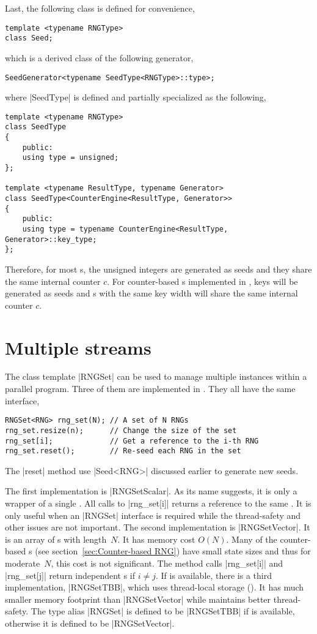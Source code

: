 Last, the following class is defined for convenience,
\begin{verbatim}
template <typename RNGType>
class Seed;
\end{verbatim}
which is a derived class of the following generator,
\begin{verbatim}
SeedGenerator<typename SeedType<RNGType>::type>;
\end{verbatim}
where |SeedType| is defined and partially specialized as the following,
\begin{verbatim}
template <typename RNGType>
class SeedType
{
    public:
    using type = unsigned;
};

template <typename ResultType, typename Generator>
class SeedType<CounterEngine<ResultType, Generator>>
{
    public:
    using type = typename CounterEngine<ResultType, Generator>::key_type;
};
\end{verbatim}
Therefore, for most \rng{}s, the unsigned integers are generated as seeds and
they share the same internal counter $c$. For counter-based \rng{}s implemented
in \mckl, keys will be generated as seeds and \rng{}s with the same key width
will share the same internal counter $c$.

\section{Multiple \texorpdfstring{\rng}{RNG} streams}
\label{sec:Multiple RNG streams}

The class template |RNGSet| can be used to manage multiple \rng instances
within a parallel program. Three of them are implemented in \mckl. They all
have the same interface,
\begin{verbatim}
RNGSet<RNG> rng_set(N); // A set of N RNGs
rng_set.resize(n);      // Change the size of the set
rng_set[i];             // Get a reference to the i-th RNG
rng_set.reset();        // Re-seed each RNG in the set
\end{verbatim}
The |reset| method use |Seed<RNG>| discussed earlier to generate new seeds.

The first implementation is |RNGSetScalar|. As its name suggests, it is only a
wrapper of a single \rng. All calls to |rng_set[i]| returns a reference to the
same \rng. It is only useful when an |RNGSet| interface is required while the
thread-safety and other issues are not important. The second implementation is
|RNGSetVector|. It is an array of \rng{}s with length~$N$. It has memory cost
$O(N)$. Many of the counter-based \rng{}s (see section~\ref{sec:Counter-based
RNG}) have small state sizes and thus for moderate~$N$, this cost is not
significant. The method calls |rng_set[i]| and |rng_set[j]| return independent
\rng{}s if $i \ne j$. If \tbb is available, there is a third implementation,
|RNGSetTBB|, which uses thread-local storage (\tls). It has much smaller memory
footprint than |RNGSetVector| while maintains better thread-safety. The type
alias |RNGSet| is defined to be |RNGSetTBB| if \tbb is available, otherwise it
is defined to be |RNGSetVector|.

